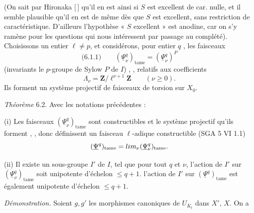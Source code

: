 \documentclass[11pt,a4paper]{article}
\begin{document}
(On sait par Hironaka [\,] qu'il en est ainsi si $S$ est excellent de car. nulle, et  il semble plausible qu'il en est de même dès que $S$ est excellent, sans restriction de caractéristique. D'ailleurs l'hypothèse « $S$ excellent » est anodine, car on s'y ramène pour les questions qui nous intéressent par passage au complété).  Choisissons un entier $\ell \neq p$, et considérons, pour   entier $q$ , les faisceaux
\[
\text{(6.1.1)} \qquad (\underline{\Psi}^q_\nu)_{\mathrm{tame}} = (\underline{\Psi}^q_\nu)^P
\]
(invariants   le $p$-groupe de Sylow $P$ de $I$) \struck{\ill{}}, \struck{\ill{}} , relatifs aux coefficients
\[
\Lambda_\nu = \mathbf{Z}/\ell^{\nu+1}\mathbf{Z} \qquad (\nu \geqslant 0) .
\]
Ils forment un système projectif de faisceaux de torsion sur $X_0$.

\emph{Théorème} 6.2. Avec les notations précédentes :

(i) Les faisceaux $(\underline{\Psi}^q_\nu)_{\mathrm{tame}}$ sont constructibles et  le système projectif qu'ils forment , , donc définissent un faisceau $\ell$-adique constructible (SGA 5 VI 1.1)
\[
(\underline{\Psi}^q)_{\mathrm{tame}} = \varprojlim_\nu (\underline{\Psi}^q_\nu)_{\mathrm{tame}} .
\]


(ii) Il existe un sous-groupe  $I'$ de $I$,  tel que pour tout $q$ et $\nu$, l'action de $I'$ sur $(\underline{\Psi}^q_\nu)_{\mathrm{tame}}$ soit unipotente d'échelon \struck{\ill{}} $\leqslant q+1$.   l'action de $I'$ sur $(\underline{\Psi}^q)_{\mathrm{tame}}$ est également unipotente d'échelon \struck{\ill{}} $\leqslant q+1$.

\emph{Démonstration.} Soient $g, g'$ les morphismes canoniques de $U_{\overline{K}_t}$ dans $X'$, $X$. On a

\end{document}
